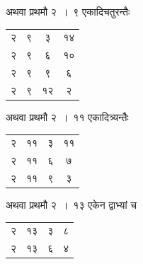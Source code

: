 \documentclass[11pt, openany]{book}
\begin{document}
\begin{minipage}[]{0.6\textwidth}
अथवा प्रथमौ २~।~९ एकादिचतुरन्तैः\textemdash 
\end{minipage}
\begin{minipage}[]{0.5\textwidth}
	\begin{tabular}{|c|c|c|c|}
	\hline
		२ & ९ & ३ & १४\\
		२ & ९ & ६ & १०\\
		२ & ९ & ९ & ६\\
		२ & ९ & १२ & २\\
		\hline
	\end{tabular}
\end{minipage}

\begin{minipage}[]{0.6\textwidth}
	अथवा प्रथमौ २~।~११ एकादित्र्यन्तैः\textemdash 
\end{minipage}
\begin{minipage}[]{0.5\textwidth}
\vspace{0.2cm}	
\begin{tabular}{|c|c|c|c|}
\hline
२ & ११ & ३ & ११\\
२ & ११ & ६ & ७\\
२ & ११ & ९ & ३\\
\hline
\end{tabular}
\end{minipage}

\begin{minipage}[]{0.6\textwidth}
अथवा प्रथमौ २~।~१३ एकेन द्वाभ्यां च 
\end{minipage}
\vspace{0.2cm}
\begin{minipage}[]{0.5\textwidth}
	\vspace{0.2cm}
	\begin{tabular}{|c|c|c|c|}
		\hline
		२ & १३ & ३ & ८\\
		२ & १३ & ६ & ४\\
	\hline
	\end{tabular}
\end{minipage}
\end{document}
